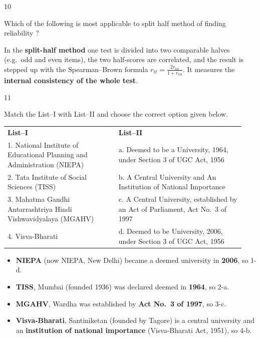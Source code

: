 \begin{question}{10}
{Which of the following is most applicable to split half method of finding reliability ?\par}
\begin{explain}
In the \textbf{split-half method} one test is divided into two comparable halves (e.g.\ odd and even items), the two half-scores are correlated, and the result is stepped up with the Spearman--Brown formula $r_{tt}=\frac{2r_{hh}}{1+r_{hh}}$. It measures the \textbf{internal consistency of the whole test}.
\end{explain}
\end{question}

\begin{question}{11}
{Match the List--I with List--II and choose the correct option given below.\\[2pt]
\begin{tabular}{@{}p{0.44\linewidth}p{0.5\linewidth}@{}}
\textbf{List--I} & \textbf{List--II}\\
1. National Institute of Educational Planning and Administration (NIEPA) & a. Deemed to be a University, 1964, under Section 3 of UGC Act, 1956\\
2. Tata Institute of Social Sciences (TISS) & b. A Central University and An Institution of National Importance\\
3. Mahatma Gandhi Antarrashtriya Hindi Vishwavidyalaya (MGAHV) & c. A Central University, established by an Act of Parliament, Act No.~3 of 1997\\
4. Visva-Bharati & d. Deemed to be University, 2006, under Section 3 of UGC Act, 1956\\
\end{tabular}\par}
\begin{explain}
\begin{itemize}
\item \textbf{NIEPA} (now NIEPA, New Delhi) became a deemed university in \textbf{2006}, so 1-d.
\item \textbf{TISS}, Mumbai (founded 1936) was declared deemed in \textbf{1964}, so 2-a.
\item \textbf{MGAHV}, Wardha was established by \textbf{Act No.~3 of 1997}, so 3-c.
\item \textbf{Visva-Bharati}, Santiniketan (founded by Tagore) is a central university and an \textbf{institution of national importance} (Visva-Bharati Act, 1951), so 4-b.
\end{itemize}
\end{explain}
\end{question}

